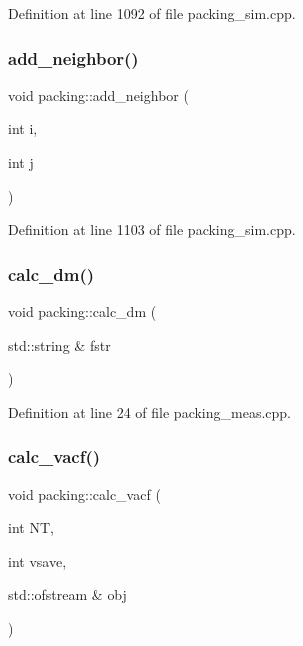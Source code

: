Definition at line 1092 of file packing\+\_\+sim.\+cpp.

\mbox{\label{classpacking_a9a47d7d55eb9fa7a4083571fc2a9b78f}} 
\subsubsection{\texorpdfstring{add\+\_\+neighbor()}{add\_neighbor()}}
{\footnotesize\ttfamily void packing\+::add\+\_\+neighbor (\begin{DoxyParamCaption}\item[{int}]{i,  }\item[{int}]{j }\end{DoxyParamCaption})}



Definition at line 1103 of file packing\+\_\+sim.\+cpp.

\mbox{\label{classpacking_ad87b894a228262a83190cae54f8a8bb2}} 
\subsubsection{\texorpdfstring{calc\+\_\+dm()}{calc\_dm()}}
{\footnotesize\ttfamily void packing\+::calc\+\_\+dm (\begin{DoxyParamCaption}\item[{std\+::string \&}]{fstr }\end{DoxyParamCaption})}



Definition at line 24 of file packing\+\_\+meas.\+cpp.

\mbox{\label{classpacking_afaa70769d1b1faadad9e530f09fe26b9}} 
\subsubsection{\texorpdfstring{calc\+\_\+vacf()}{calc\_vacf()}}
{\footnotesize\ttfamily void packing\+::calc\+\_\+vacf (\begin{DoxyParamCaption}\item[{int}]{NT,  }\item[{int}]{vsave,  }\item[{std\+::ofstream \&}]{obj }\end{DoxyParamCaption})}



